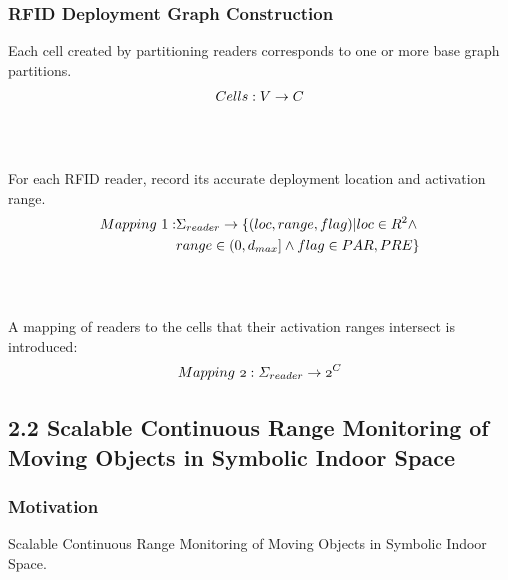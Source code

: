 \documentclass{beamer}
\begin{document}
\begin{frame}
\frametitle{RFID Deployment Graph Construction}

\small{Each cell created by partitioning readers corresponds to one or more base graph partitions.}
\pause
\begin{equation}
\mathnormal{Cells: V \rightarrow C}
\end{equation}
\\~\\
\pause

\small{For each RFID reader, record its accurate deployment location and activation range.}
\pause
\begin{equation}
\mathnormal{
\begin{aligned}
Mapping~1: &\Sigma_{reader} \rightarrow \{ (loc, range, flag) | loc \in R^2 \wedge \\
  &range \in (0,d_{max}] \wedge flag \in {PAR, PRE} \}
\end{aligned}
}
\end{equation}
\\~\\
\pause

\small{A mapping of readers to the cells that their activation ranges intersect is introduced:}
\pause
\begin{equation}
\mathnormal{
Mapping~2: \Sigma_{reader} \rightarrow 2^C
}
\end{equation}

\end{frame}



\subsection{2.2 Scalable Continuous Range Monitoring of Moving Objects in Symbolic Indoor Space} %

\begin{frame}
\frametitle{Motivation}
Scalable Continuous Range Monitoring of Moving Objects in Symbolic Indoor Space.~\cite{DBLP:conf/cikm/YangLJ09}\\~\\


\end{frame}
\end{document}

